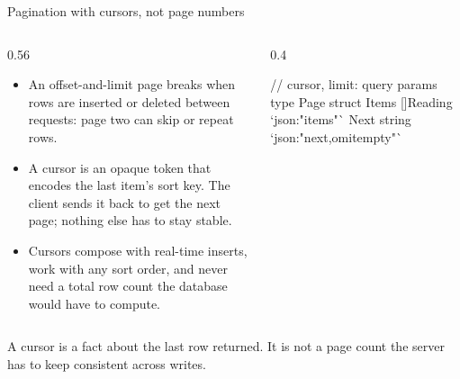 \documentclass[10pt,aspectratio=169,t]{beamer}
\begin{document}
\begin{frame}[fragile,eyebrow=API design]{Pagination with cursors, not page numbers}
  \begin{columns}[T]
    \begin{column}{0.56\textwidth}
      \begin{itemize}
        \item An offset-and-limit page breaks when rows are inserted or deleted between requests: page two can skip or repeat rows.
        \item A cursor is an opaque token that encodes the last item's sort key. The client sends it back to get the next page; nothing else has to stay stable.
        \item Cursors compose with real-time inserts, work with any sort order, and never need a total row count the database would have to compute.
      \end{itemize}
    \end{column}
    \begin{column}{0.4\textwidth}
\begin{golang}
// cursor, limit: query params
type Page struct {
    Items []Reading `json:"items"`
    Next  string `json:"next,omitempty"`
}
\end{golang}
    \end{column}
  \end{columns}
  \begin{takeaway}{A cursor is a fact about the last row returned.}
    It is not a page count the server has to keep consistent across writes.
  \end{takeaway}
\end{frame}
\end{document}
